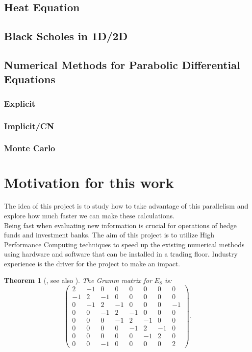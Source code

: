 \documentclass[12pt, oneside]{book}
\theoremstyle{plain}
\newtheorem{theorem}{Theorem}[section]
\theoremstyle{definition}
\begin{document}
\subsection{Heat Equation}
\lipsum[5]
\subsection{Black Scholes in 1D/2D}
\lipsum[5]
\subsection{Numerical Methods for Parabolic Differential Equations}
\lipsum[5]
\subsubsection{Explicit}
\lipsum[5]
\subsubsection{Implicit/CN}
\lipsum[5]
\subsubsection{Monte Carlo}
\lipsum[5]

\section{Motivation for this work}
The idea of this project is to study how to take advantage of this parallelism and explore how much faster we can make these calculations.
\\
Being fast when evaluating new information is crucial for operations of hedge funds and investment banks. The aim of this project is to utilize High Performance Computing techniques to speed up the existing numerical methods using hardware and software that can be installed in a trading floor. Industry experience is the driver for the project to make an impact.

\begin{theorem}[{\cite[Theorem 2.3]{Petri}, see also \cite[pg. 45]{BlackScholes}}]\label{PetriTheorem}
The Gramm matrix for $E_8$ is:
$$
\begin{pmatrix}
2	&-1&0	&0	&0	&0	&0	&0\\
-1	&2	&-1	&0	&0	&0	&0	&0\\
0	&-1	&2	&-1	&0	&0	&0	&-1\\
0	&0	&-1	&2	&-1	&0	&0	&0\\
0	&0	&0	&-1	&2	&-1	&0	&0\\
0	&0	&0	&0	&-1	&2	&-1	&0\\
0	&0	&0	&0	&0	&-1	&2	&0\\
0	&0	&-1	&0	&0	&0	&0	&2
\end{pmatrix}.
$$
\end{theorem}
\end{document}

